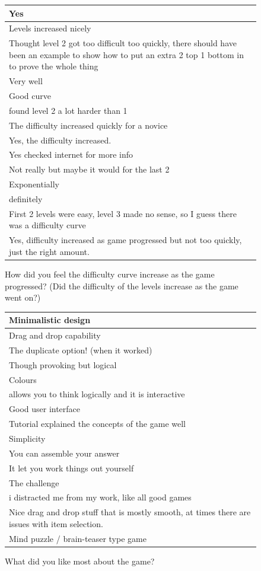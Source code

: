 \begin{figure}[H]
\begin{tabular}{|p{12cm}|} 
\hline
Yes \\
\hline
Levels increased nicely \\
\hline
Thought level 2 got too difficult too quickly, there should have been an example to show how to put an extra 2 top 1 bottom in to prove the whole thing \\
\hline
Very well \\ 
\hline
Good curve \\
\hline
found level 2 a lot harder than 1 \\
\hline
The difficulty increased quickly for a novice \\
\hline
Yes, the difficulty increased. \\
\hline
Yes checked internet for more info \\
\hline
Not really but maybe it would for the last 2 \\
\hline
Exponentially \\
\hline
definitely \\
\hline
First 2 levels were easy, level 3 made no sense, so I guess there was a difficulty curve \\
\hline
Yes, difficulty increased as game progressed but not too quickly, just the right amount. \\
\hline
\end{tabular}
\caption{How did you feel the difficulty curve increase as the game progressed? (Did the difficulty of the levels increase as the game went on?)}
\end{figure}

\begin{figure}[H]
\begin{tabular}{|p{12cm}|} 
\hline
Minimalistic design \\
\hline
Drag and drop capability \\
\hline
The duplicate option! (when it worked) \\
\hline
Though provoking but logical \\
\hline
Colours \\ 
\hline
allows you to think logically and it is interactive \\
\hline
Good user interface \\
\hline
Tutorial explained the concepts of the game well \\
\hline
Simplicity \\
\hline
You can assemble your answer \\
\hline
It let you work things out yourself \\
\hline
The challenge \\
\hline
i distracted me from my work, like all good games \\
\hline
Nice drag and drop stuff that is mostly smooth, at times there are issues with item selection. \\
\hline
Mind puzzle / brain-teaser type game \\
\hline
\end{tabular}
\caption{What did you like most about the game?}
\end{figure}

